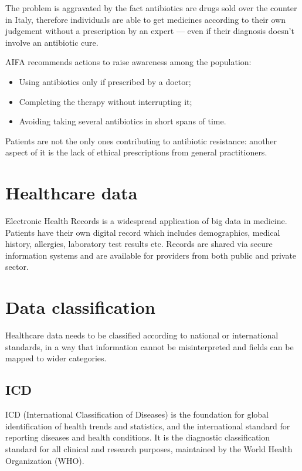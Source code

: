 The problem is aggravated by the fact antibiotics are drugs sold over the counter in Italy, therefore individuals are able to get medicines according to their own judgement without a prescription by an expert --- even if their diagnosis doesn't involve an antibiotic cure.

AIFA recommends actions to raise awareness among the population\cite{aifaar}:
\begin{itemize}
	\item Using antibiotics only if prescribed by a doctor;
	\item Completing the therapy without interrupting it;
	\item Avoiding taking several antibiotics in short spans of time.
\end{itemize}

Patients are not the only ones contributing to antibiotic resistance: another aspect of it is the lack of ethical prescriptions from general practitioners. 




\section{Healthcare data}
Electronic Health Records is a widespread application of big data in medicine. Patients have their own digital record which includes demographics, medical history, allergies, laboratory test results etc. Records are shared via secure information systems and are available for providers from both public and private sector\cite{datapine}.


\section{Data classification}
Healthcare data needs to be classified according to national or international standards, in a way that information cannot be misinterpreted and fields can be mapped to wider categories.

\subsection{ICD}
ICD (International Classification of Diseases) is the foundation for global identification of health trends and statistics, and the international standard for reporting diseases and health conditions. It is the diagnostic classification standard for all clinical and research purposes\cite{who}, maintained by the World Health Organization (WHO).

